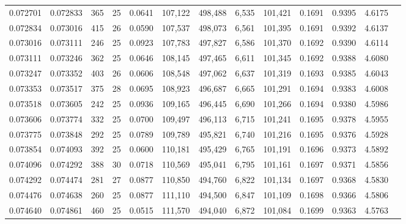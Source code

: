 \begin{tabular}{rrrrrrrrrrrrr}
0.072701 & 0.072833 & 365 &  25 &                                     0.0641 & 107,122 & 498,488 &   6,535 & 101,421 & 0.1691 & 0.9395 & 4.6175 \\
0.072834 & 0.073016 & 415 &  26 &                                     0.0590 & 107,537 & 498,073 &   6,561 & 101,395 & 0.1691 & 0.9392 & 4.6137 \\
0.073016 & 0.073111 & 246 &  25 &                                     0.0923 & 107,783 & 497,827 &   6,586 & 101,370 & 0.1692 & 0.9390 & 4.6114 \\
0.073111 & 0.073246 & 362 &  25 &                                     0.0646 & 108,145 & 497,465 &   6,611 & 101,345 & 0.1692 & 0.9388 & 4.6080 \\
0.073247 & 0.073352 & 403 &  26 &                                     0.0606 & 108,548 & 497,062 &   6,637 & 101,319 & 0.1693 & 0.9385 & 4.6043 \\
0.073353 & 0.073517 & 375 &  28 &                                     0.0695 & 108,923 & 496,687 &   6,665 & 101,291 & 0.1694 & 0.9383 & 4.6008 \\
0.073518 & 0.073605 & 242 &  25 &                                     0.0936 & 109,165 & 496,445 &   6,690 & 101,266 & 0.1694 & 0.9380 & 4.5986 \\
0.073606 & 0.073774 & 332 &  25 &                                     0.0700 & 109,497 & 496,113 &   6,715 & 101,241 & 0.1695 & 0.9378 & 4.5955 \\
0.073775 & 0.073848 & 292 &  25 &                                     0.0789 & 109,789 & 495,821 &   6,740 & 101,216 & 0.1695 & 0.9376 & 4.5928 \\
0.073854 & 0.074093 & 392 &  25 &                                     0.0600 & 110,181 & 495,429 &   6,765 & 101,191 & 0.1696 & 0.9373 & 4.5892 \\
0.074096 & 0.074292 & 388 &  30 &                                     0.0718 & 110,569 & 495,041 &   6,795 & 101,161 & 0.1697 & 0.9371 & 4.5856 \\
0.074292 & 0.074474 & 281 &  27 &                                     0.0877 & 110,850 & 494,760 &   6,822 & 101,134 & 0.1697 & 0.9368 & 4.5830 \\
0.074476 & 0.074638 & 260 &  25 &                                     0.0877 & 111,110 & 494,500 &   6,847 & 101,109 & 0.1698 & 0.9366 & 4.5806 \\
0.074640 & 0.074861 & 460 &  25 &                                     0.0515 & 111,570 & 494,040 &   6,872 & 101,084 & 0.1699 & 0.9363 & 4.5763 \\

\end{tabular}
